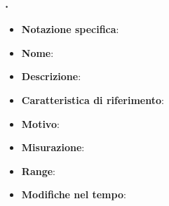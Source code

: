 \subsubsection{.}
\begin{itemize}
    \item \textbf{Notazione specifica}:
    \item \textbf{Nome}:
    \item \textbf{Descrizione}:
    \item \textbf{Caratteristica di riferimento}: 
    \item \textbf{Motivo}: 
    \item \textbf{Misurazione}: 
    \item \textbf{Range}: 
    \item \textbf{Modifiche nel tempo}:  
\end{itemize}